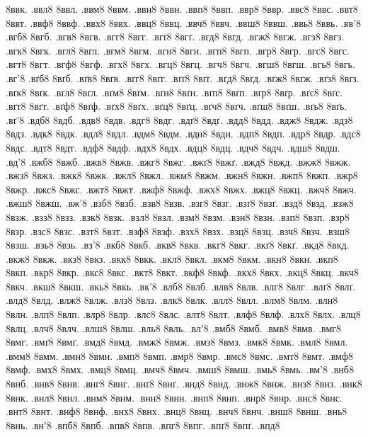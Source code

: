 {8ввк.
.ввл8
8ввл.
.ввм8
8ввм.
.ввн8
8ввн.
.ввп8
8ввп.
.ввр8
8ввр.
.ввс8
8ввс.
.ввт8
8ввт.
.ввф8
8ввф.
.ввх8
8ввх.
.ввц8
8ввц.
.ввч8
8ввч.
.ввш8
8ввш.
.ввь8
8ввь.
.вв'8
.вгб8
8вгб.
.вгв8
8вгв.
.вгг8
8вгг.
.вгґ8
8вгґ.
.вгд8
8вгд.
.вгж8
8вгж.
.вгз8
8вгз.
.вгк8
8вгк.
.вгл8
8вгл.
.вгм8
8вгм.
.вгн8
8вгн.
.вгп8
8вгп.
.вгр8
8вгр.
.вгс8
8вгс.
.вгт8
8вгт.
.вгф8
8вгф.
.вгх8
8вгх.
.вгц8
8вгц.
.вгч8
8вгч.
.вгш8
8вгш.
.вгь8
8вгь.
.вг'8
.вґб8
8вґб.
.вґв8
8вґв.
.вґг8
8вґг.
.вґґ8
8вґґ.
.вґд8
8вґд.
.вґж8
8вґж.
.вґз8
8вґз.
.вґк8
8вґк.
.вґл8
8вґл.
.вґм8
8вґм.
.вґн8
8вґн.
.вґп8
8вґп.
.вґр8
8вґр.
.вґс8
8вґс.
.вґт8
8вґт.
.вґф8
8вґф.
.вґх8
8вґх.
.вґц8
8вґц.
.вґч8
8вґч.
.вґш8
8вґш.
.вґь8
8вґь.
.вґ'8
.вдб8
8вдб.
.вдв8
8вдв.
.вдг8
8вдг.
.вдґ8
8вдґ.
.вдд8
8вдд.
.вдж8
8вдж.
.вдз8
8вдз.
.вдк8
8вдк.
.вдл8
8вдл.
.вдм8
8вдм.
.вдн8
8вдн.
.вдп8
8вдп.
.вдр8
8вдр.
.вдс8
8вдс.
.вдт8
8вдт.
.вдф8
8вдф.
.вдх8
8вдх.
.вдц8
8вдц.
.вдч8
8вдч.
.вдш8
8вдш.
.вд'8
.вжб8
8вжб.
.вжв8
8вжв.
.вжг8
8вжг.
.вжґ8
8вжґ.
.вжд8
8вжд.
.вжж8
8вжж.
.вжз8
8вжз.
.вжк8
8вжк.
.вжл8
8вжл.
.вжм8
8вжм.
.вжн8
8вжн.
.вжп8
8вжп.
.вжр8
8вжр.
.вжс8
8вжс.
.вжт8
8вжт.
.вжф8
8вжф.
.вжх8
8вжх.
.вжц8
8вжц.
.вжч8
8вжч.
.вжш8
8вжш.
.вж'8
.взб8
8взб.
.взв8
8взв.
.взг8
8взг.
.взґ8
8взґ.
.взд8
8взд.
.взж8
8взж.
.взз8
8взз.
.взк8
8взк.
.взл8
8взл.
.взм8
8взм.
.взн8
8взн.
.взп8
8взп.
.взр8
8взр.
.взс8
8взс.
.взт8
8взт.
.взф8
8взф.
.взх8
8взх.
.взц8
8взц.
.взч8
8взч.
.взш8
8взш.
.взь8
8взь.
.вз'8
.вкб8
8вкб.
.вкв8
8вкв.
.вкг8
8вкг.
.вкґ8
8вкґ.
.вкд8
8вкд.
.вкж8
8вкж.
.вкз8
8вкз.
.вкк8
8вкк.
.вкл8
8вкл.
.вкм8
8вкм.
.вкн8
8вкн.
.вкп8
8вкп.
.вкр8
8вкр.
.вкс8
8вкс.
.вкт8
8вкт.
.вкф8
8вкф.
.вкх8
8вкх.
.вкц8
8вкц.
.вкч8
8вкч.
.вкш8
8вкш.
.вкь8
8вкь.
.вк'8
.влб8
8влб.
.влв8
8влв.
.влг8
8влг.
.влґ8
8влґ.
.влд8
8влд.
.влж8
8влж.
.влз8
8влз.
.влк8
8влк.
.влл8
8влл.
.влм8
8влм.
.влн8
8влн.
.влп8
8влп.
.влр8
8влр.
.влс8
8влс.
.влт8
8влт.
.влф8
8влф.
.влх8
8влх.
.влц8
8влц.
.влч8
8влч.
.влш8
8влш.
.вль8
8вль.
.вл'8
.вмб8
8вмб.
.вмв8
8вмв.
.вмг8
8вмг.
.вмґ8
8вмґ.
.вмд8
8вмд.
.вмж8
8вмж.
.вмз8
8вмз.
.вмк8
8вмк.
.вмл8
8вмл.
.вмм8
8вмм.
.вмн8
8вмн.
.вмп8
8вмп.
.вмр8
8вмр.
.вмс8
8вмс.
.вмт8
8вмт.
.вмф8
8вмф.
.вмх8
8вмх.
.вмц8
8вмц.
.вмч8
8вмч.
.вмш8
8вмш.
.вмь8
8вмь.
.вм'8
.внб8
8внб.
.внв8
8внв.
.внг8
8внг.
.внґ8
8внґ.
.внд8
8внд.
.внж8
8внж.
.внз8
8внз.
.внк8
8внк.
.внл8
8внл.
.внм8
8внм.
.внн8
8внн.
.внп8
8внп.
.внр8
8внр.
.внс8
8внс.
.внт8
8внт.
.внф8
8внф.
.внх8
8внх.
.внц8
8внц.
.внч8
8внч.
.внш8
8внш.
.внь8
8внь.
.вн'8
.впб8
8впб.
.впв8
8впв.
.впг8
8впг.
.впґ8
8впґ.
.впд8
}
